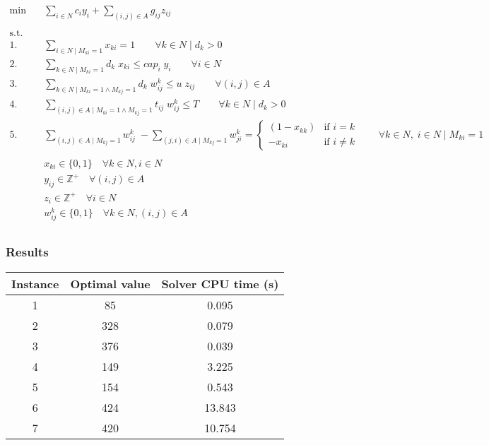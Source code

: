 \begin{align*}
    \min \quad & \sum_{i \in N} c_i y_i + \sum_{(i, j) \in A} g_{ij} z_{ij} & \\
	\\
    \text{s.t.} \quad &  \\
	1. \quad & \sum_{i \in N \mid M_{ki} = 1} x_{ki} = 1 \qquad \forall k \in N \mid d_k > 0  \\
	2. \quad & \sum_{k \in N \mid M_{ki} = 1} d_k \; x_{ki} \le cap_i \; y_i \qquad \forall i \in N  \\
	3. \quad & \sum_{k \in N \mid M_{ki} = 1 \land M_{kj} = 1} d_k \; w_{ij}^k \le u \; z_{ij} \qquad \forall (i, j) \in A \quad  \\
	4. \quad & \sum_{(i, j) \in A \mid M_{ki} = 1 \land M_{kj} = 1} t_{ij} \; w_{ij}^k \le T \qquad \forall k \in N \mid d_k > 0  \\
	5. \quad & \sum_{(i, j) \in A \mid M_{kj} = 1} w_{ij}^k \; - \sum_{(j, i) \in A \mid M_{kj} = 1} w_{ji}^k = \left\{
	\begin{array}{rl}
		(1 - x_{kk}) & \text{if } i = k  \\
		-x_{ki} & \text{if } i \ne k
	\end{array}
	\right.
	\qquad \forall k \in N, \; i \in N \mid M_{ki} = 1  \\
	\\
	& x_{ki} \in \{0, 1\} \quad \forall k \in N, i \in N  \\
	& y_{ij} \in \mathbb{Z}^+ \quad \forall (i, j) \in A  \\
	& z_i \in \mathbb{Z}^+ \quad \forall i \in N  \\
	& w_{ij}^k \in \{0, 1\} \quad \forall k \in N, (i, j) \in A  \\
\end{align*}


\subsubsection*{Results}

\begin{table}[h!]
	\centering
	\begin{tabular}{|c|c|c|}
		\hline
		\textbf{Instance} & \textbf{Optimal value} & \textbf{Solver CPU time (s)} \\
		\hline
		1 & 85  & 0.095 \\
		\hline
		2 & 328 & 0.079 \\
		\hline
		3 & 376 & 0.039 \\
		\hline
		4 & 149 & 3.225 \\
		\hline
		5 & 154 & 0.543 \\
		\hline
		6 & 424 & 13.843 \\
		\hline
		7 & 420 & 10.754 \\
		\hline
	\end{tabular}
	\label{tab:instance_costs}
\end{table}
